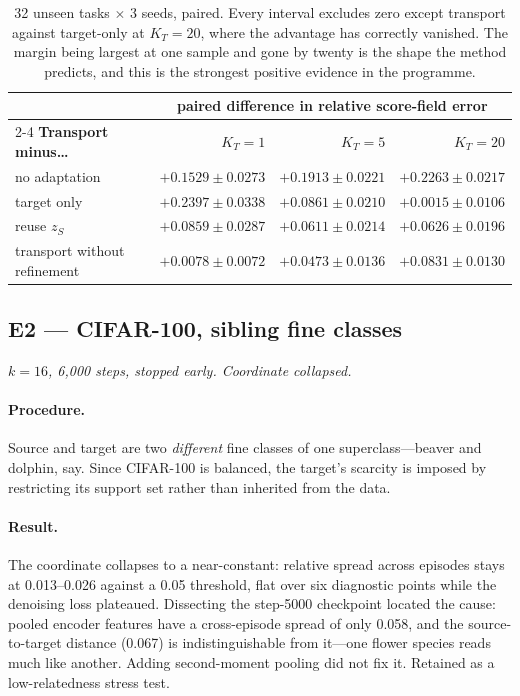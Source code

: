 \documentclass[11pt]{article}
\newcommand{\zS}{z_{S}}
\newcommand{\KT}{K_{T}}
\begin{document}
\begin{table}[htbp]
\centering\small
\begin{tabular}{@{}lrrr@{}}
\toprule
& \multicolumn{3}{c}{paired difference in relative score-field error} \\
\cmidrule(lr){2-4}
\textbf{Transport minus\ldots} & $\KT=1$ & $\KT=5$ & $\KT=20$ \\
\midrule
no adaptation              & $+0.1529\pm0.0273$ & $+0.1913\pm0.0221$ & $+0.2263\pm0.0217$ \\
target only                & $+0.2397\pm0.0338$ & $+0.0861\pm0.0210$ & $+0.0015\pm0.0106$ \\
reuse $\zS$                & $+0.0859\pm0.0287$ & $+0.0611\pm0.0214$ & $+0.0626\pm0.0196$ \\
transport without refinement & $+0.0078\pm0.0072$ & $+0.0473\pm0.0136$ & $+0.0831\pm0.0130$ \\
\bottomrule
\end{tabular}
\caption{32 unseen tasks $\times$ 3 seeds, paired. Every interval excludes zero except transport
against target-only at $\KT=20$, where the advantage has correctly vanished. The margin being
largest at one sample and gone by twenty is the shape the method predicts, and this is the
strongest positive evidence in the programme.}
\end{table}

\subsection{E2 --- CIFAR-100, sibling fine classes}

\textit{$k=16$, 6{,}000 steps, stopped early. Coordinate collapsed.}

\paragraph{Procedure.} Source and target are two \emph{different} fine classes of one
superclass---beaver and dolphin, say. Since CIFAR-100 is balanced, the target's scarcity is imposed
by restricting its support set rather than inherited from the data.

\paragraph{Result.} The coordinate collapses to a near-constant: relative spread across episodes
stays at 0.013--0.026 against a 0.05 threshold, flat over six diagnostic points while the denoising
loss plateaued. Dissecting the step-5000 checkpoint located the cause: pooled encoder features have
a cross-episode spread of only 0.058, and the source-to-target distance (0.067) is indistinguishable
from it---one flower species reads much like another. Adding second-moment pooling did not fix it.
Retained as a low-relatedness stress test.
\end{document}
